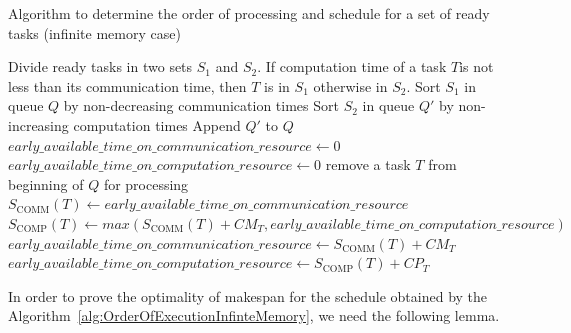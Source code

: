 \documentclass[sigconf]{acmart}
\newcommand{\scomm}{\ensuremath{{S}_{\text{COMM}}}}
\newcommand{\scomp}{\ensuremath{{S}_{\text{COMP}}}}
\begin{document}
	\begin{algorithm}
		\caption{\label{alg:OrderOfExecutionInfinteMemory}Algorithm to determine the order of processing and schedule for a set of ready tasks (infinite memory case)}
		\begin{algorithmic}[1]
			\STATE Divide ready tasks in two sets $S_1$ and $S_2$. If computation time of a task $T$is not less than its communication time, then $T$ is in $S_1$ otherwise in $S_2$.
			\STATE Sort $S_1$ in queue $Q$ by non-decreasing communication times
			\STATE Sort $S_2$ in queue $Q'$ by non-increasing computation times
			\STATE Append $Q'$ to $Q$
			\STATE $early\_available\_time\_on\_communication\_resource \gets 0$
			\STATE $early\_available\_time\_on\_computation\_resource \gets 0$
			\STATE remove a task $T$ from beginning of $Q$ for processing
			\STATE $\scomm(T) \gets  early\_available\_time\_on\_communication\_resource$
			\STATE $\scomp(T) \gets  max(\scomm(T) + CM_T, early\_available\_time\_on\_computation\_resource)$
			\STATE $early\_available\_time\_on\_communication\_resource \gets  \scomm(T) + CM_T$
			\STATE $early\_available\_time\_on\_computation\_resource \gets  \scomp(T) + CP_T$
			\ENDWHILE
		\end{algorithmic}
	\end{algorithm}
	
\noindent In order to prove the optimality of makespan for the schedule obtained by the  Algorithm~\ref{alg:OrderOfExecutionInfinteMemory}, we need the following lemma.
	
\end{document}
